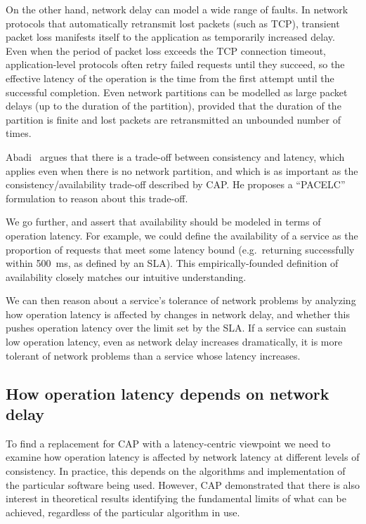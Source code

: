 \documentclass[a4paper,twocolumn,10pt]{article}
\begin{document}
On the other hand, network delay can model a wide range of faults. In network protocols that
automatically retransmit lost packets (such as TCP), transient packet loss manifests itself to the
application as temporarily increased delay. Even when the period of packet loss exceeds the TCP
connection timeout, application-level protocols often retry failed requests until they succeed, so
the effective latency of the operation is the time from the first attempt until the successful
completion. Even network partitions can be modelled as large packet delays (up to the duration of
the partition), provided that the duration of the partition is finite and lost packets are
retransmitted an unbounded number of times.

Abadi~\cite{Abadi2012hb} argues that there is a trade-off between consistency and latency, which
applies even when there is no network partition, and which is as important as the
consistency/availability trade-off described by CAP. He proposes a ``PACELC'' formulation to reason
about this trade-off.

We go further, and assert that availability should be modeled in terms of operation latency. For
example, we could define the availability of a service as the proportion of requests that meet some
latency bound (e.g.\ returning successfully within 500~ms, as defined by an SLA). This
empirically-founded definition of availability closely matches our intuitive understanding.

We can then reason about a service's tolerance of network problems by analyzing how operation
latency is affected by changes in network delay, and whether this pushes operation latency over the
limit set by the SLA. If a service can sustain low operation latency, even as network delay
increases dramatically, it is more tolerant of network problems than a service whose latency
increases.

\subsection{How operation latency depends on network delay}\label{sec:network-dependence}

To find a replacement for CAP with a latency-centric viewpoint we need to examine how operation
latency is affected by network latency at different levels of consistency. In practice, this depends
on the algorithms and implementation of the particular software being used. However, CAP
demonstrated that there is also interest in theoretical results identifying the fundamental limits
of what can be achieved, regardless of the particular algorithm in use.
\end{document}
